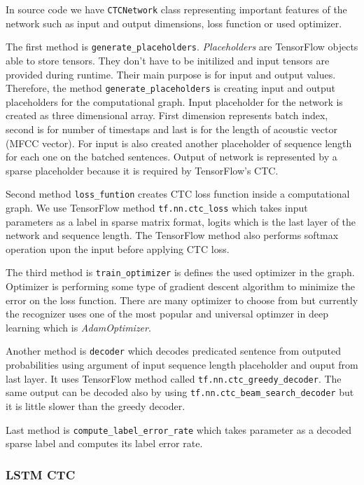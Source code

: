 In source code we have \texttt{CTCNetwork} class representing important features of the network such as input and output dimensions, loss function or used optimizer.

The first method is \texttt{generate\_placeholders}. \textit{Placeholders} are TensorFlow objects able to store tensors. They don't have to be initilized and input tensors are provided during runtime.
Their main purpose is for input and output values.
Therefore, the method \texttt{generate\_placeholders} is creating input and output placeholders for the computational graph.
Input placeholder for the network is created as three dimensional array. First dimension represents batch index, second is for number of timestaps and last is for the length of acoustic vector (MFCC vector).
For input is also created another placeholder of sequence length for each one on the batched sentences.
Output of network is represented by a sparse placeholder because it is required by TensorFlow's CTC.

Second method \texttt{loss\_funtion} creates CTC loss function inside a computational graph.
We use TensorFlow method \texttt{tf.nn.ctc\_loss} which takes input parameters as a label in sparse matrix format, logits which is the last layer of the network and sequence length.
The TensorFlow method also performs softmax operation upon the input before applying CTC loss.

The third method is \texttt{train\_optimizer} is defines the used optimizer in the graph. Optimizer is performing some type of gradient descent algorithm to minimize the error on the loss function.
There are many optimizer to choose from but currently the recognizer uses one of the most popular and universal optimzer in deep learning which is \textit{AdamOptimizer}.

Another method is \texttt{decoder} which decodes predicated sentence from outputed probabilities using argument of input sequence length placeholder and ouput from last layer.
It uses TensorFlow method called \texttt{tf.nn.ctc\_greedy\_decoder}. The same output can be decoded also by using \texttt{tf.nn.ctc\_beam\_search\_decoder} but it is little slower than the greedy decoder.

Last method is \texttt{compute\_label\_error\_rate} which takes parameter as a decoded sparse label and computes its label error rate.

\subsubsection{LSTM CTC}

